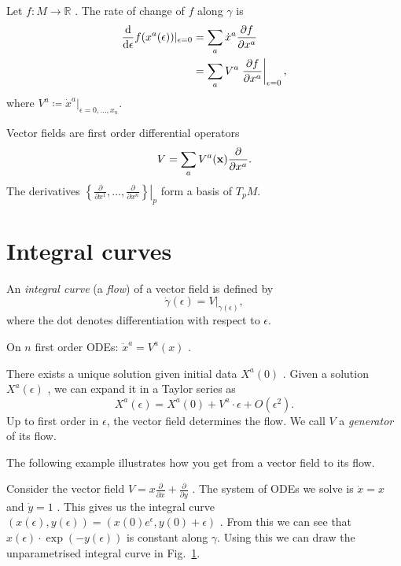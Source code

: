 Let $f\colon M \to \mathbb{R}$ . The rate of change of $f$  along $ \gamma$ is
\begin{align}
  \dv{}{\epsilon} f(x^{a}(\epsilon)) \rvert_{\epsilon =0} &= \sum_a \dot{x}^{a} \frac{\partial f}{\partial x^{a}} \\
						      &= \sum_a V^{a} \left. \frac{\partial f}{\partial x^{a}}\right\rvert_{\epsilon=0},
\end{align}
where $V^{a} \coloneqq \dot{x}^{a}\rvert_{\epsilon=0, \dots, x_n}$.

Vector fields are first order differential operators
\begin{equation}
  V = \sum_a V^{a}(\vb{x}) \frac{\partial }{\partial x^{a}}.
\end{equation}
The derivatives $\left.\left\{ \frac{\partial }{\partial x^1}, \dots, \frac{\partial }{\partial x^{n}} \right\} \right\rvert_p$ form a basis of $T_p M$. 

\section{Integral curves}%
\label{sec:integral_curves}

\begin{definition}
  An \emph{integral curve} (a \emph{flow}) of a vector field is defined by
  \begin{equation}
    \dot{\gamma} (\epsilon) = V \rvert_{\gamma(\epsilon)},
  \end{equation}
  where the dot denotes differentiation with respect to $\epsilon$.
\end{definition}

On $n$  first order ODEs: $\dot{x}^{a} = V^{a} (x)$ .

There exists a unique solution given initial data $X^{a} (0)$ .
Given a solution $X^{a}(\epsilon)$ , we can expand it in a Taylor series as
\begin{equation}
  X^{a}(\epsilon) = X^{a}(0) + V^{a} \cdot \epsilon + O(\epsilon^2).
\end{equation}
Up to first order in $\epsilon$, the vector field determines the flow.
We call  $V$  a \emph{generator} of its flow.

The following example illustrates how you get from a vector field to its flow.
\begin{example}[$M = \mathbb{R}^2$, $x^{a} = (x, y)$]
  Consider the vector field $V = x \frac{\partial }{\partial x} + \frac{\partial }{\partial y}$ .
  The system of ODEs we solve is $\dot{x} = x$ and $\dot{y} = 1$ .
  This gives us the integral curve $(x(\epsilon), y(\epsilon)) = (x(0)e^\epsilon, y(0) + \epsilon)$ .
  From this we can see that $x(\epsilon) \cdot \exp(-y (\epsilon))$  is constant along $\gamma$.
  Using this we can draw the unparametrised integral curve in Fig.~\ref{fig:l2f3}.
   \begin{figure}[tbhp]
    \centering
    \def\svgwidth{0.4\columnwidth}
    
    \caption{}
    \label{fig:l2f3}
  \end{figure}
\end{example}

